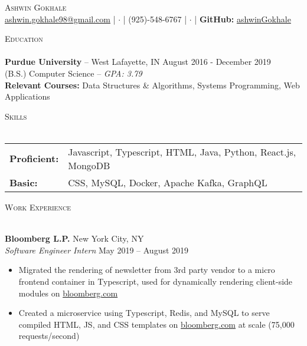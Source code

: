 \documentclass[a4paper, 10pt]{article}
\newcommand{\lineunder} {
    \vspace*{-8pt} \\
    \hspace*{-18pt} \hrulefill \\
}
\newcommand{\header} [1] {
    {
        \hspace*{-18pt}\vspace*{6pt}
        {\large\textsc{#1}}
    }
    \vspace*{-6pt} \lineunder
}
\newcommand{\contact} [2] {
    \vspace*{-10pt}
    \begin{center}
        {\Huge \scshape {#1}}
        \vspace*{5pt}
        \\ #2
    \end{center}
    \vspace*{-10pt}
}
\begin{document}
\vspace*{-40pt}



\vspace*{-10pt}
\contact{Ashwin Gokhale}{
	\href{mailto:ashwin.gokhale98@gmail.com}{ashwin.gokhale98@gmail.com} |
	$\cdot$ | (925)-548-6767 | $\cdot$ |
	\textbf{GitHub:}
	\href{https://goo.gl/R79aeK}{ashwinGokhale}
}

\vspace{10pt}

\header{Education}
\textbf{Purdue University} -- West Lafayette, IN
\hfill August 2016 - December 2019\\
(B.S.) Computer Science -- \textit{GPA: 3.79}
\\

\textbf{Relevant Courses:} Data Structures \& Algorithms, Systems Programming, Web Applications
\vspace{2mm}

\vspace{1mm}
\header{Skills}
\vspace{1mm}
\begin{tabular}{ l l }
	\textbf{Proficient:} & Javascript, Typescript, HTML, Java, Python, React.js, MongoDB \\
	\textbf{Basic:}      & CSS, MySQL, Docker, Apache Kafka, GraphQL \\
\end{tabular}
\vspace{2mm}

\header{Work Experience}
\vspace{1mm}

\textbf{Bloomberg L.P.} \hfill New York City, NY\\
\textit{Software Engineer Intern} \hfill May 2019 -- August 2019\\
\vspace{-1mm}
\begin{itemize} \itemsep 1pt
	\item Migrated the rendering of newsletter from 3rd party vendor to a micro frontend container in Typescript, used for dynamically rendering client-side modules on \href{https://www.bloomberg.com}{bloomberg.com}
	\item Created a microservice using Typescript, Redis, and MySQL to serve compiled HTML, JS, and CSS templates on
	\href{https://www.bloomberg.com}{bloomberg.com} at scale (75,000 requests/second)
\end{itemize}
\end{document}
